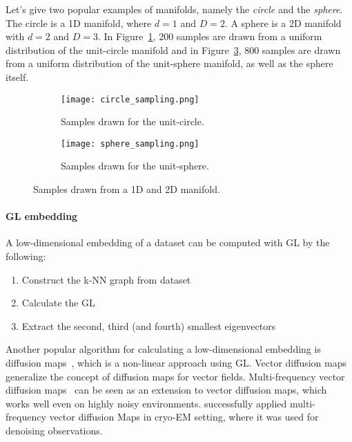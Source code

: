 Let's give two popular examples of manifolds, namely the \textit{circle} and the \textit{sphere}.
The circle is a 1D manifold, where $d=1$ and $D=2$. A sphere is a 2D manifold with $d=2$ and $D=3$.
In Figure~\ref{fig:circle_sampling}, 200 samples are drawn from a uniform distribution of the unit-circle manifold
and in Figure~\ref{fig:sphere_sampling}, 800 samples are drawn from a uniform distribution of the unit-sphere manifold,
as well as the sphere itself.



\begin{figure}[H]
    \captionsetup[subfigure]{justification=centering}
    \centering
    \begin{subfigure}[t]{0.4\textwidth}
        \texttt{[image: circle\_sampling.png]}
        \caption{Samples drawn for the unit-circle.}
        \label{fig:circle_sampling}
    \end{subfigure}\hfill
    \begin{subfigure}[t]{0.4\textwidth}
      \texttt{[image: sphere\_sampling.png]}
      \caption{Samples drawn for the unit-sphere.}
      \label{fig:sphere_sampling}
    \end{subfigure}\hfill
    \caption{Samples drawn from a 1D and 2D manifold.}
  \end{figure}


\paragraph{GL embedding}
\label{sec:manifold_calculation}
A low-dimensional embedding of a dataset can be computed with GL by the following:

\begin{enumerate}
    \item Construct the k-NN graph from dataset
    \item Calculate the GL
    \item Extract the second, third (and fourth) smallest eigenvectors
\end{enumerate}

Another popular algorithm for calculating a low-dimensional embedding is diffusion maps~\cite{diffusionMaps}, 
which is a non-linear approach using GL.
Vector diffusion maps~\cite{vectorDiffusionMaps} generalize the concept of diffusion maps for vector fields.
Multi-frequency vector diffusion maps~\cite{multiDiffusionMaps} 
can be seen as an extension to vector diffusion maps, which works well even on highly noisy environments.
\citet{cryoEmMutliDM} successfully applied multi-frequency vector diffusion Maps in cryo-EM setting,
 where it was used for denoising observations.


